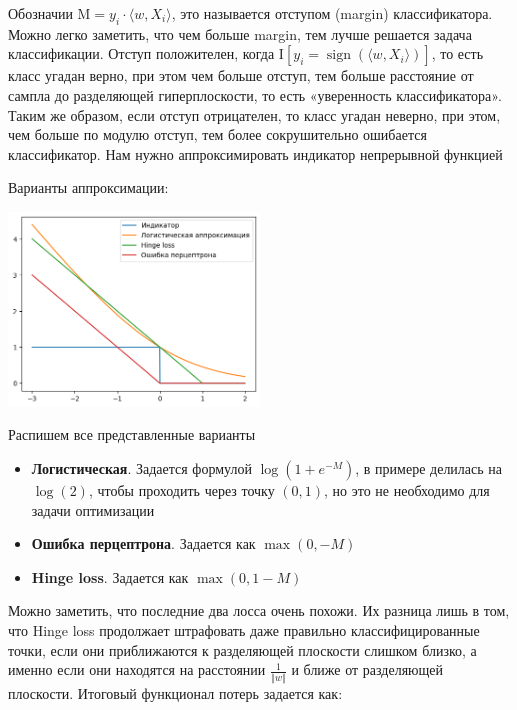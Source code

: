 \documentclass{article}
\begin{document}
    Обозначии $\text{M} = y_{i} \cdot \langle w, X_{i} \rangle$, это называется отступом (margin) классификатора. 
    Можно легко заметить, что чем больше margin, тем лучше решается задача классификации. 
    Отступ положителен, когда $\text{I}[y_{i} = \operatorname{sign}( \langle w, X_{i} \rangle)]$, 
    то есть класс угадан верно, при этом чем больше отступ, тем больше расстояние от сампла
    до разделяющей гиперплоскости, то есть «уверенность классификатора».
    Таким же образом, если отступ отрицателен, то класс угадан неверно, 
    при этом, чем больше по модулю отступ, тем более сокрушительно ошибается классификатор.
    Нам нужно аппроксимировать индикатор непрерывной функцией

    Варианты аппроксимации: 

    \begin{center}
        \includegraphics[width=0.5\textwidth]{photos/lin_mod_class_loss.png}
    \end{center}

    Распишем все представленные варианты

    \begin{itemize}
        \item \textbf{Логистическая}. Задается формулой $\log(1 + e^{-M})$, в примере делилась на $\log(2)$, чтобы 
        проходить через точку $(0, 1)$, но это не необходимо для задачи оптимизации
        \item \textbf{Ошибка перцептрона}. Задается как $\max(0, -M)$
        \item \textbf{Hinge loss}. Задается как $\max(0, 1 - M)$
    \end{itemize}

    Можно заметить, что последние два лосса очень похожи. Их разница лишь в том, что Hinge loss продолжает 
    штрафовать даже правильно классифицированные точки, если они приближаются к разделяющей плоскости слишком 
    близко, а именно если они находятся на расстоянии $\frac{1}{\Vert w \Vert}$ и ближе от разделяющей плоскости. 
    Итоговый функционал потерь задается как: 
\end{document}
